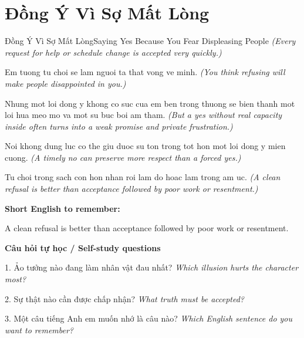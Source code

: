\section{Đồng Ý Vì Sợ Mất Lòng}
\begin{truyen}{Đồng Ý Vì Sợ Mất Lòng}{Saying Yes Because You Fear Displeasing People}
\textit{(Every request for help or schedule change is accepted very quickly.)}

Em tuong tu choi se lam nguoi ta that vong ve minh.
\textit{(You think refusing will make people disappointed in you.)}

Nhung mot loi dong y khong co suc cua em ben trong thuong se bien thanh mot loi hua meo mo va mot su buc boi am tham.
\textit{(But a yes without real capacity inside often turns into a weak promise and private frustration.)}

Noi khong dung luc co the giu duoc su ton trong tot hon mot loi dong y mien cuong.
\textit{(A timely no can preserve more respect than a forced yes.)}

\end{truyen}

\begin{baihoc}
Tu choi trong sach con hon nhan roi lam do hoac lam trong am uc.
\textit{(A clean refusal is better than acceptance followed by poor work or resentment.)}
\end{baihoc}

\begin{ghinhoanh}
\textbf{Short English to remember:}

A clean refusal is better than acceptance followed by poor work or resentment.

\end{ghinhoanh}

\begin{tuhocnhanh}
\textbf{Câu hỏi tự học / Self-study questions}

1. Ảo tưởng nào đang làm nhân vật đau nhất? \textit{Which illusion hurts the character most?}

2. Sự thật nào cần được chấp nhận? \textit{What truth must be accepted?}

3. Một câu tiếng Anh em muốn nhớ là câu nào? \textit{Which English sentence do you want to remember?}
\end{tuhocnhanh}
\ngancach

